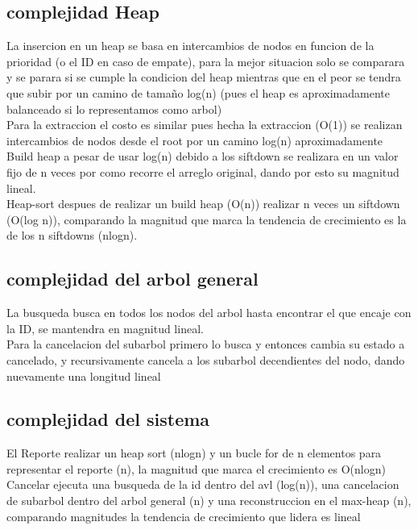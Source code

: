 \documentclass[conference,onecolumn]{IEEEtran}
\begin{document}
\subsection{complejidad Heap}
La insercion en un heap se basa en intercambios de nodos en funcion de la prioridad (o el ID en caso de empate), para la mejor situacion solo se comparara y se parara si se cumple la condicion del heap mientras que en el peor se tendra que subir por un camino de tamaño log(n) (pues el heap es aproximadamente balanceado si lo representamos como arbol)
\\
Para la extraccion el costo es similar pues hecha la extraccion (O(1)) se realizan intercambios de nodos desde el root por un camino log(n) aproximadamente
\\
Build heap a pesar de usar log(n) debido a los siftdown se realizara en un valor fijo de n veces por como recorre el arreglo original, dando por esto su magnitud lineal.
\\
Heap-sort despues de realizar un build heap (O(n)) realizar n veces un siftdown (O(log n)), comparando la magnitud que marca la tendencia de crecimiento es la de los n siftdowns (nlogn).
\subsection{complejidad del arbol general}
La busqueda busca en todos los nodos del arbol hasta encontrar el que encaje con la ID, se mantendra en magnitud lineal.
\\
Para la cancelacion del subarbol primero lo busca y entonces cambia su estado a cancelado, y recursivamente cancela a los subarbol decendientes del nodo, dando nuevamente una longitud lineal
\subsection{complejidad del sistema}
El Reporte realizar un heap sort (nlogn) y un bucle for de n elementos para representar el reporte (n), la magnitud que marca el crecimiento es O(nlogn)
\\
Cancelar ejecuta una busqueda de la id dentro del avl (log(n)), una cancelacion de subarbol dentro del arbol general (n) y una reconstruccion en el max-heap (n), comparando magnitudes la tendencia de crecimiento que lidera es lineal
\end{document}
